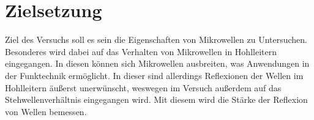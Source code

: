 \section{Zielsetzung}
\label{sec:Zielsetzung}

Ziel des Versuchs soll es sein die Eigenschaften von Mikrowellen zu Untersuchen.
Besonderes wird dabei auf das Verhalten von Mikrowellen in Hohlleitern eingegangen.
In diesen können sich Mikrowellen ausbreiten, was Anwendungen in der Funktechnik ermöglicht.
In dieser sind allerdings Reflexionen der Wellen im Hohlleitern äußerst unerwünscht, weswegen im Versuch außerdem auf das Stehwellenverhältnis eingegangen wird.
Mit diesem wird die Stärke der Reflexion von Wellen bemessen.
